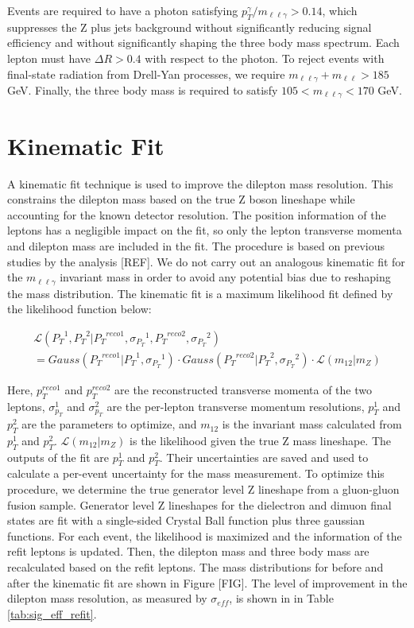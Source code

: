 Events are required to have a photon satisfying $p_{T}^{\gamma}/m_{\ell\ell\gamma} > 0.14$, which suppresses the Z plus jets 
background without significantly reducing signal efficiency and without significantly shaping the three body mass spectrum.
Each lepton must have $\Delta R > 0.4$ with respect to the photon. To reject events with final-state radiation from 
Drell-Yan processes, we require $m_{\ell\ell\gamma} + m_{\ell\ell} > 185$ GeV. Finally, the three body mass is required to 
satisfy $105 < m_{\ell\ell\gamma} < 170$ GeV. 

\section{Kinematic Fit}
A kinematic fit technique is used to improve the dilepton mass resolution. This constrains the dilepton mass based on the true 
Z boson lineshape while accounting for the known detector resolution. The position information of the leptons has a negligible impact
on the fit, so only the lepton transverse momenta and dilepton mass are included in the fit. The procedure is based on previous
studies by the \hzz analysis [REF]. We do not carry out an analogous kinematic fit for the $m_{\ell\ell\gamma}$ invariant 
mass in order to avoid any potential bias due to reshaping the mass distribution. The kinematic fit is a maximum likelihood fit 
defined by the likelihood function below: 

\begin{equation}
\begin{aligned}
\mathcal{L}({P_{T}}^{1},{P_{T}}^{2}|{P_{T}}^{reco1},{\sigma_{P_{T}}}^1,{P_{T}}^{reco2},{\sigma_{P_{T}}}^2) \\
=Gauss({P_{T}}^{reco1}|{P_{T}}^{1},{\sigma_{P_{T}}}^1)\cdot Gauss({P_{T}}^{reco2}|{P_{T}}^{2},{\sigma_{P_{T}}}^2)\cdot\mathcal{L}(m_{12}|m_{Z})
\end{aligned}
\end{equation}

Here, $p_{T}^{reco1}$ and $p_{T}^{reco2}$ are the reconstructed transverse momenta of the two leptons, 
$\sigma_{p_{T}}^{1}$ and $\sigma_{p_{T}}^{2}$ are the per-lepton transverse momentum resolutions, 
$p_{T}^{1}$ and $p_{T}^{2}$ are the parameters to optimize, and $m_{12}$ is the invariant mass 
calculated from $p_{T}^{1}$ and $p_{T}^{2}$. $\mathcal{L}(m_{12}|m_{Z})$ is the likelihood given the true Z mass lineshape. 
The outputs of the fit are $p_{T}^{1}$ and $p_{T}^{2}$.
Their uncertainties are saved and used to calculate a per-event uncertainty for the mass measurement.
To optimize this procedure, we determine the true generator level Z lineshape from a gluon-gluon fusion \hzg sample.
Generator level Z lineshapes for the dielectron and dimuon final states are fit with 
a single-sided Crystal Ball function plus three gaussian functions.
For each event, the likelihood is maximized and the \pt information of the refit leptons is updated. 
Then, the dilepton mass and three body mass are recalculated based on the refit leptons.
The mass distributions for before and after the kinematic fit are shown in Figure [FIG]. The level of improvement in the 
dilepton mass resolution, 
as measured by $\sigma_{eff}$, is shown in in Table \ref{tab:sig_eff_refit}.

